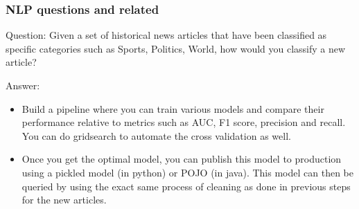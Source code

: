 \documentclass[11pt]{beamer}
\begin{document}
\begin{frame}
\frametitle{NLP questions and related}
\begin{block}{Question:}
	Given a set of historical news articles that have been classified as specific categories such as Sports, Politics, World, how would you classify a new article?
\end{block}
\begin{block}{Answer:}
	\begin{itemize}
		\item Build a pipeline where you can train various models and compare their performance relative to metrics such as AUC, F1 score, precision and recall. You can do gridsearch to automate the cross validation as well.
		\item Once you get the optimal model, you can publish this model to production using a pickled model (in python) or POJO (in java). This model can then be queried by using the exact same process of cleaning as done in previous steps for the new articles.
	\end{itemize}
\end{block}
\end{frame}
\end{document}
